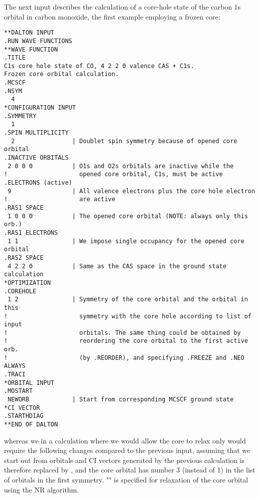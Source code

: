 \begin{center}
\end{center}

The next input describes the calculation of a core-hole state of the
carbon 1s orbital in carbon monoxide, the first
example employing a frozen core:

\begin{verbatim}
**DALTON INPUT
.RUN WAVE FUNCTIONS
**WAVE FUNCTION
.TITLE
C1s core hole state of CO, 4 2 2 0 valence CAS + C1s.
Frozen core orbital calculation.
.MCSCF
.NSYM
  4
*CONFIGURATION INPUT
.SYMMETRY
  1
.SPIN MULTIPLICITY
  2                | Doublet spin symmetry because of opened core orbital
.INACTIVE ORBITALS
 2 0 0 0           | O1s and O2s orbitals are inactive while the
!                    opened core orbital, C1s, must be active
.ELECTRONS (active)
 9                 | All valence electrons plus the core hole electron
!                    are active
.RAS1 SPACE
 1 0 0 0           | The opened core orbital (NOTE: always only this orb.)
.RAS1 ELECTRONS
 1 1               | We impose single occupancy for the opened core orbital
.RAS2 SPACE
 4 2 2 0           | Same as the CAS space in the ground state calculation
*OPTIMIZATION
.COREHOLE
 1 2               | Symmetry of the core orbital and the orbital in this
!                    symmetry with the core hole according to list of input
!                    orbitals. The same thing could be obtained by
!                    reordering the core orbital to the first active orb.
!                    (by .REORDER), and specifying .FREEZE and .NEO ALWAYS
.TRACI
*ORBITAL INPUT
.MOSTART
 NEWORB            | Start from corresponding MCSCF ground state
*CI VECTOR
.STARTHDIAG
**END OF DALTON
\end{verbatim}
\label{sirius_ex6}


whereas we in a calculation where we would allow the core to
relax only would require the following changes
compared to the previous input, assuming that we start out from
orbitals and CI vectors generated by the previous calculation
 is therefore replaced by , and
the core orbital has number 3 (instead of 1) in the list of
orbitals in the first symmetry. "" is specified for
relaxation of the core orbital using the NR algorithm.


